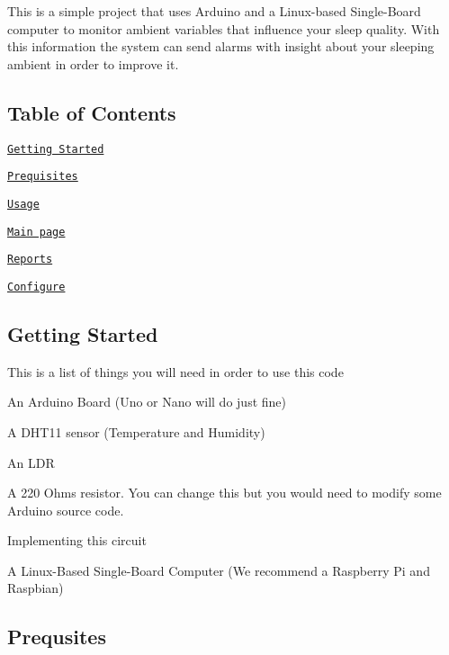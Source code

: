 This is a simple project that uses Arduino and a Linux-\/based Single-\/\+Board computer to monitor ambient variables that influence your sleep quality. With this information the system can send alarms with insight about your sleeping ambient in order to improve it.

\subsection*{Table of Contents}


\begin{DoxyItemize}
\item \href{#getting-started}{\tt Getting Started}
\item \href{#prequsites}{\tt Prequisites}
\item \href{#usage}{\tt Usage}
\begin{DoxyItemize}
\item \href{#home-page}{\tt Main page}
\item \href{#reports}{\tt Reports}
\item \href{#configure}{\tt Configure}
\end{DoxyItemize}
\end{DoxyItemize}

\subsection*{Getting Started}

This is a list of things you will need in order to use this code
\begin{DoxyItemize}
\item An Arduino Board (Uno or Nano will do just fine)
\begin{DoxyItemize}
\item A D\+H\+T11 sensor (Temperature and Humidity)
\item An L\+DR
\item A 220 Ohms resistor. You can change this but you would need to modify some Arduino source code.
\item Implementing this circuit 
\end{DoxyItemize}
\item A Linux-\/\+Based Single-\/\+Board Computer (We recommend a Raspberry Pi and Raspbian) \subsection*{Prequsites}
\end{DoxyItemize}

